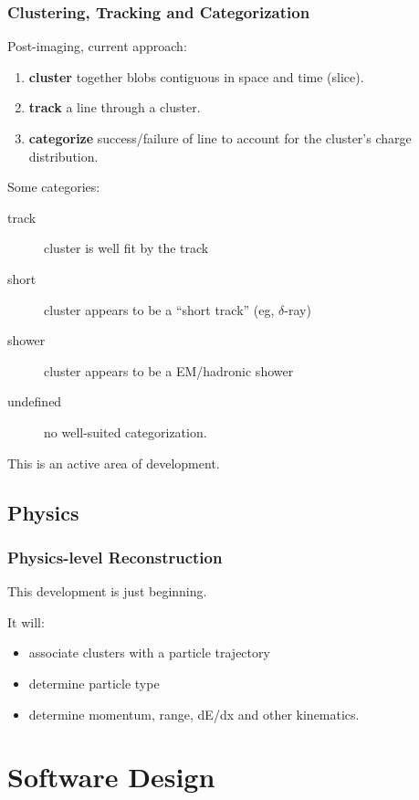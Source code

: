 \documentclass[xcolor=dvipsnames]{beamer}
\begin{document}
\begin{frame}
  \frametitle{Clustering, Tracking and Categorization}
  Post-imaging, current approach:
  \begin{enumerate}
  \item \textbf{cluster} together blobs contiguous in space and time
    (slice).
  \item \textbf{track} a line through a cluster.
  \item \textbf{categorize} success/failure of line to account for the
    cluster's charge distribution.
  \end{enumerate}
  Some categories:
  \begin{description}
  \item[track] cluster is well fit by the track
  \item[short] cluster appears to be a ``short track'' (eg, $\delta$-ray)
  \item[shower] cluster appears to be a EM/hadronic shower
  \item[undefined] no well-suited categorization.
  \end{description}

  This is an active area of development.

\end{frame}

\subsection{Physics}
\begin{frame}
  \frametitle{Physics-level Reconstruction}

  This development is just beginning.
  
  It will:
  \begin{itemize}
  \item associate clusters with a particle trajectory
  \item determine particle type
  \item determine momentum, range, dE/dx and other kinematics.
  \end{itemize}

\end{frame}


\section{Software Design}

\begin{frame}
\end{frame}
\end{document}
